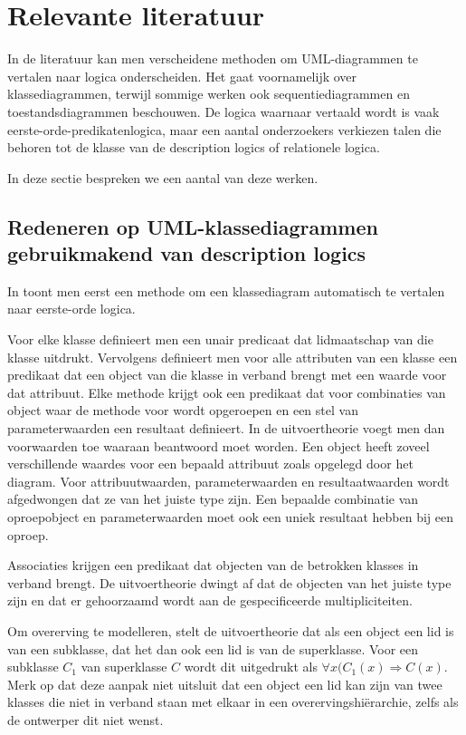\chapter{Relevante literatuur}
In de literatuur kan men verscheidene methoden om UML-diagrammen te vertalen naar logica onderscheiden. Het gaat voornamelijk over klassediagrammen, terwijl sommige werken ook sequentiediagrammen en toestandsdiagrammen beschouwen. De logica waarnaar vertaald wordt is vaak eerste-orde-predikatenlogica, maar een aantal onderzoekers verkiezen talen die behoren tot de klasse van de description logics of relationele logica.

In deze sectie bespreken we een aantal van deze werken.

\section{Redeneren op UML-klassediagrammen gebruikmakend van description logics}
In \cite{BerardiDaniela2005RoUc} toont men eerst een methode om een klassediagram automatisch te vertalen naar eerste-orde logica.

Voor elke klasse definieert men een unair predicaat dat lidmaatschap van die klasse uitdrukt. Vervolgens definieert men voor alle attributen van een klasse een predikaat dat een object van die klasse in verband brengt met een waarde voor dat attribuut. Elke methode krijgt ook een predikaat dat voor combinaties van object waar de methode voor wordt opgeroepen en een stel van parameterwaarden een resultaat definieert. In de uitvoertheorie voegt men dan voorwaarden toe waaraan beantwoord moet worden. Een object heeft zoveel verschillende waardes voor een bepaald attribuut zoals opgelegd door het diagram. Voor attribuutwaarden, parameterwaarden en resultaatwaarden wordt afgedwongen dat ze van het juiste type zijn. Een bepaalde combinatie van oproepobject en parameterwaarden moet ook een uniek resultaat hebben bij een oproep.

Associaties krijgen een predikaat dat objecten van de betrokken klasses in verband brengt. De uitvoertheorie dwingt af dat de objecten van het juiste type zijn en dat er gehoorzaamd wordt aan de gespecificeerde multipliciteiten.

Om overerving te modelleren, stelt de uitvoertheorie dat als een object een lid is van een subklasse, dat het dan ook een lid is van de superklasse. Voor een subklasse $C_1$ van superklasse $C$ wordt dit uitgedrukt als $\forall{x}(C_1(x) \Rightarrow C(x)$. Merk op dat deze aanpak niet uitsluit dat een object een lid kan zijn van twee klasses die niet in verband staan met elkaar in een overervingshi\"erarchie, zelfs als de ontwerper dit niet wenst.

